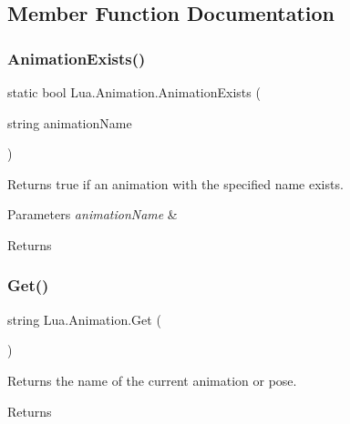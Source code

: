 \subsection{Member Function Documentation}
\mbox{\label{class_lua_1_1_animation_a1002a4f745d48a64fd26affa514ee0d2}} 
\subsubsection{\texorpdfstring{AnimationExists()}{AnimationExists()}}
{\footnotesize\ttfamily static bool Lua.\+Animation.\+Animation\+Exists (\begin{DoxyParamCaption}\item[{string}]{animation\+Name }\end{DoxyParamCaption})\hspace{0.3cm}{\ttfamily [static]}}



Returns true if an animation with the specified name exists. 


\begin{DoxyParams}{Parameters}
{\em animation\+Name} & \\
\hline
\end{DoxyParams}
\begin{DoxyReturn}{Returns}

\end{DoxyReturn}
\mbox{\label{class_lua_1_1_animation_afa4d0d4dc374917da05e5c26e75c20b0}} 
\subsubsection{\texorpdfstring{Get()}{Get()}}
{\footnotesize\ttfamily string Lua.\+Animation.\+Get (\begin{DoxyParamCaption}{ }\end{DoxyParamCaption})}



Returns the name of the current animation or pose. 

\begin{DoxyReturn}{Returns}

\end{DoxyReturn}
\mbox{\label{class_lua_1_1_animation_a62391765462757427af96fbde304ec23}} 
